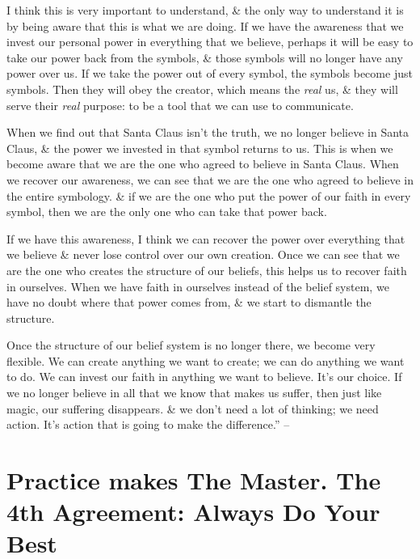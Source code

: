 \documentclass{article}
\numberwithin{equation}{section}
\begin{document}
I think this is very important to understand, \& the only way to understand it is by being aware that this is what we are doing. If we have the awareness that we invest our personal power in everything that we believe, perhaps it will be easy to take our power back from the symbols, \& those symbols will no longer have any power over us. If we take the power out of every symbol, the symbols become just symbols. Then they will obey the creator, which means the \textit{real} us, \& they will serve their \textit{real} purpose: to be a tool that we can use to communicate.

When we find out that Santa Claus isn't the truth, we no longer believe in Santa Claus, \& the power we invested in that symbol returns to us. This is when we become aware that we are the one who agreed to believe in Santa Claus. When we recover our awareness, we can see that we are the one who agreed to believe in the entire symbology. \& if we are the one who put the power of our faith in every symbol, then we are the only one who can take that power back.

If we have this awareness, I think we can recover the power over everything that we believe \& never lose control over our own creation. Once we can see that we are the one who creates the structure of our beliefs, this helps us to recover faith in ourselves. When we have faith in ourselves instead of the belief system, we have no doubt where that power comes from, \& we start to dismantle the structure.

Once the structure of our belief system is no longer there, we become very flexible. We can create anything we want to create; we can do anything we want to do. We can invest our faith in anything we want to believe. It's our choice. If we no longer believe in all that we know that makes us suffer, then just like magic, our suffering disappears. \& we don't need a lot of thinking; we need action. It's action that is going to make the difference.'' -- \cite[pp. 60--64]{Ruiz_Ruiz2011}


\section{Practice makes The Master. The 4th Agreement: Always Do Your Best}

\end{document}
